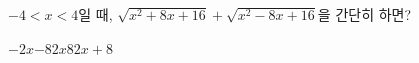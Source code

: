 $-4<x<4$일 때, $\sqrt{x^2+8x+16}+\sqrt{x^2-8x+16}$을 간단히 하면?
\begin{choices32}{$-2x$}{$-8$}{$2x$}{$8$}{$2x+8$}\end{choices32}
